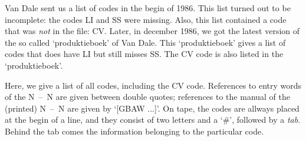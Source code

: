 Van Dale sent us a list of codes in the begin of 1986. This list turned
out to be incomplete: the codes LI and SS were missing. Also, this list
contained a code that was {\em not} in the file: CV. Later, in december 1986,
we got the latest version of the so called `produktieboek' of Van Dale. This
`produktieboek' gives a list of codes that does have LI but still misses SS.
The CV code is also listed in the `produktieboek'.

Here, we give a list of all codes, including the CV code. References to entry
words of the N~--~N are given between double quotes; references to the manual of
the (printed) N~--~N are given by `[GBAW ...]'. On tape, the codes are allways 
placed at the begin of a line, and they consist of two letters and a `\#', 
followed by a {\em tab}. Behind the tab comes the information belonging to the 
particular code.

